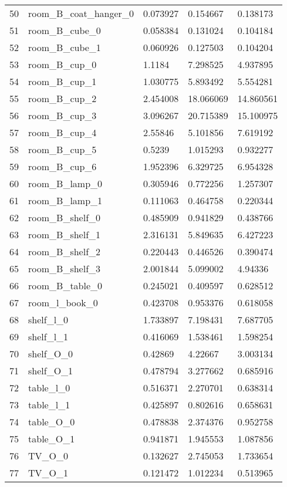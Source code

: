 \begin{longtable}{ @{\zz\extracolsep{\fill}} l|llll}
50 & room\_B\_coat\_hanger\_0 & 0.073927 & 0.154667  & 0.138173  \\
51 & room\_B\_cube\_0         & 0.058384 & 0.131024  & 0.104184  \\
52 & room\_B\_cube\_1         & 0.060926 & 0.127503  & 0.104204  \\
53 & room\_B\_cup\_0          & 1.1184   & 7.298525  & 4.937895  \\
54 & room\_B\_cup\_1          & 1.030775 & 5.893492  & 5.554281  \\
55 & room\_B\_cup\_2          & 2.454008 & 18.066069 & 14.860561 \\
56 & room\_B\_cup\_3          & 3.096267 & 20.715389 & 15.100975 \\
57 & room\_B\_cup\_4          & 2.55846  & 5.101856  & 7.619192  \\
58 & room\_B\_cup\_5          & 0.5239   & 1.015293  & 0.932277  \\
59 & room\_B\_cup\_6          & 1.952396 & 6.329725  & 6.954328  \\
60 & room\_B\_lamp\_0         & 0.305946 & 0.772256  & 1.257307  \\
61 & room\_B\_lamp\_1         & 0.111063 & 0.464758  & 0.220344  \\
62 & room\_B\_shelf\_0        & 0.485909 & 0.941829  & 0.438766  \\
63 & room\_B\_shelf\_1        & 2.316131 & 5.849635  & 6.427223  \\
64 & room\_B\_shelf\_2        & 0.220443 & 0.446526  & 0.390474  \\
65 & room\_B\_shelf\_3        & 2.001844 & 5.099002  & 4.94336   \\
66 & room\_B\_table\_0        & 0.245021 & 0.409597  & 0.628512  \\
67 & room\_l\_book\_0         & 0.423708 & 0.953376  & 0.618058  \\
68 & shelf\_l\_0              & 1.733897 & 7.198431  & 7.687705  \\
69 & shelf\_l\_1              & 0.416069 & 1.538461  & 1.598254  \\
70 & shelf\_O\_0              & 0.42869  & 4.22667   & 3.003134  \\
71 & shelf\_O\_1              & 0.478794 & 3.277662  & 0.685916  \\
72 & table\_l\_0              & 0.516371 & 2.270701  & 0.638314  \\
73 & table\_l\_1              & 0.425897 & 0.802616  & 0.658631  \\
74 & table\_O\_0              & 0.478838 & 2.374376  & 0.952758  \\
75 & table\_O\_1              & 0.941871 & 1.945553  & 1.087856  \\
76 & TV\_O\_0                 & 0.132627 & 2.745053  & 1.733654  \\
77 & TV\_O\_1                 & 0.121472 & 1.012234  & 0.513965 
\end{longtable}